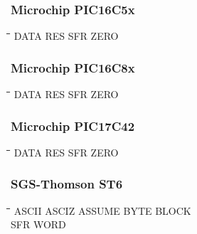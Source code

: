 \subsubsection{Microchip PIC16C5x}
{\tt\begin{tabbing}
\hspace{3cm}\=\hspace{3cm}\=\hspace{3cm}\=\hspace{3cm}\=\kill
DATA       \> RES         \> SFR         \> ZERO \\
\end{tabbing}}

\subsubsection{Microchip PIC16C8x}
{\tt\begin{tabbing}
\hspace{3cm}\=\hspace{3cm}\=\hspace{3cm}\=\hspace{3cm}\=\kill
DATA       \> RES         \> SFR         \> ZERO \\
\end{tabbing}}

\subsubsection{Microchip PIC17C42}
{\tt\begin{tabbing}
\hspace{3cm}\=\hspace{3cm}\=\hspace{3cm}\=\hspace{3cm}\=\kill
DATA       \> RES         \> SFR         \> ZERO \\
\end{tabbing}}

\subsubsection{SGS-Thomson ST6}
{\tt\begin{tabbing}
\hspace{3cm}\=\hspace{3cm}\=\hspace{3cm}\=\hspace{3cm}\=\kill
ASCII      \> ASCIZ       \> ASSUME      \> BYTE        \> BLOCK \\
SFR        \> WORD \\
\end{tabbing}}

